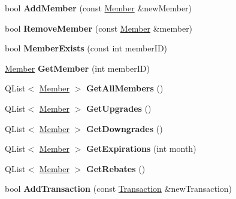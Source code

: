 \begin{DoxyCompactItemize}
\mbox{\label{class_d_b_manager_af7cfff555a5cd6c0cb191fe377033062}} 
bool {\bfseries Add\+Member} (const \mbox{\hyperlink{class_member}{Member}} \&new\+Member)
\item 
\mbox{\label{class_d_b_manager_af0857aec484261da158486c6609a9637}} 
bool {\bfseries Remove\+Member} (const \mbox{\hyperlink{class_member}{Member}} \&member)
\item 
\mbox{\label{class_d_b_manager_ae55ecc834d2785d09ec7c01a9ea1284a}} 
bool {\bfseries Member\+Exists} (const int member\+ID)
\item 
\mbox{\label{class_d_b_manager_ada9b21cf66caf785534d0072acb14530}} 
\mbox{\hyperlink{class_member}{Member}} {\bfseries Get\+Member} (int member\+ID)
\item 
\mbox{\label{class_d_b_manager_ad76ac83a09292bf6cbceab84a94f86cd}} 
Q\+List$<$ \mbox{\hyperlink{class_member}{Member}} $>$ {\bfseries Get\+All\+Members} ()
\item 
\mbox{\label{class_d_b_manager_af1cac75a2d8acbff34cc6c15a2bec6b2}} 
Q\+List$<$ \mbox{\hyperlink{class_member}{Member}} $>$ {\bfseries Get\+Upgrades} ()
\item 
\mbox{\label{class_d_b_manager_ab966716ab5a3b66bda01edffc65c51e6}} 
Q\+List$<$ \mbox{\hyperlink{class_member}{Member}} $>$ {\bfseries Get\+Downgrades} ()
\item 
\mbox{\label{class_d_b_manager_a0f85b120f3664ed2f71a916534d666d1}} 
Q\+List$<$ \mbox{\hyperlink{class_member}{Member}} $>$ {\bfseries Get\+Expirations} (int month)
\item 
\mbox{\label{class_d_b_manager_a3e2214c52bd0958e4b34aac3b3c8fbcb}} 
Q\+List$<$ \mbox{\hyperlink{class_member}{Member}} $>$ {\bfseries Get\+Rebates} ()
\item 
\mbox{\label{class_d_b_manager_ab49f55667f4141f5cdb8da1c7e64fba7}} 
bool {\bfseries Add\+Transaction} (const \mbox{\hyperlink{class_transaction}{Transaction}} \&new\+Transaction)

\end{DoxyCompactItemize}
